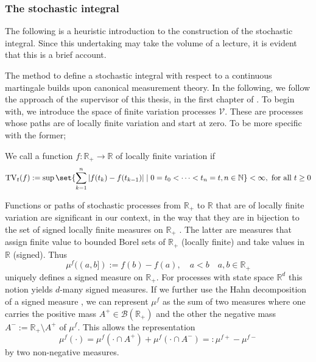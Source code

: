 		\subsubsection*{The stochastic integral}
		The following is a heuristic introduction to the construction of the stochastic integral. Since this undertaking may take the volume of a lecture, it is evident that this is a brief account. 

		The method to define a stochastic integral with respect to a continuous martingale builds upon canonical measurement theory. In the following, we follow the approach of the supervisor of this thesis, \citeauthor{PTSA} in the first chapter of \cite{PTSA}. To begin with, we introduce the space of finite variation processes $\mathcal{V}$. These are processes whose paths are of locally finite variation and start at zero. To be more specific with the former;
		\begin{definition}  We call a function $f: \mathbb{R}_+ \rightarrow \mathbb{R} $ of locally finite variation if 
			\begin{equation*}
				\operatorname{TV}_t(f) := \sup \set{ \sum_{k=1}^n | f(t_k) - f(t_{k-1}) | \mid 0 = t_0 < \cdots < t_n = t, n \in \mathbb{N} } < \infty, \text{ for all } t \geq 0
			\end{equation*}
		\end{definition}	

		Functions or paths of stochastic processes from $\mathbb{R}_+$ to $\mathbb{R}$ that are of locally finite variation are significant in our context, in the way that they are in bijection to the set of signed locally finite measures on $\mathbb{R}_+$ \cite[thm. 2.14]{Kallenberg}. The latter are measures that assign finite value to bounded Borel sets of $\mathbb{R}_+$ (locally finite) and take values in $\mathbb{R}$ (signed). Thus
\begin{equation*}
	\mu^f((a,b]) := f(b) - f(a), \quad a < b \quad a,b \in \mathbb{R}_+
\end{equation*}
uniquely defines a signed measure on $\mathbb{R}_+$. For processes with state space $\mathbb{R}^d$ this notion yields $d$-many signed measures.
If we further use the Hahn decomposition of a signed measure \cite[p. 181]{Klenke}, we can represent $\mu^f$ as the sum of two measures where one carries the positive mass $A^+ \in \mathcal{B}(\mathbb{R}_+)$ and the other the negative mass $A^- := \mathbb{R}_+ \setminus A^+$ of $\mu^f$. This allows the representation
\begin{equation*}
	\mu^f (\cdot) = \mu^f(\cdot \cap A^+) + \mu^f(\cdot \cap A^-) =: \mu^{f+} - \mu^{f-}
\end{equation*}
by two non-negative measures.

